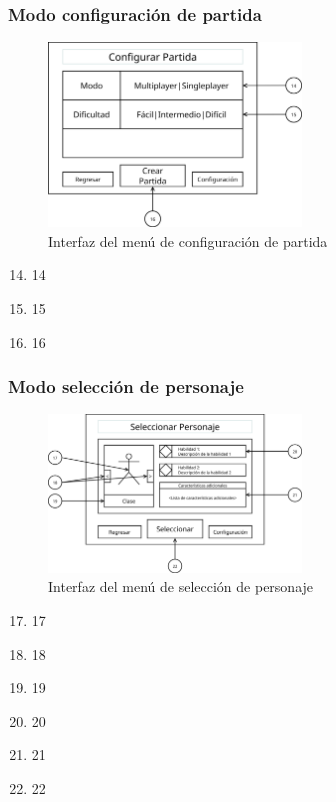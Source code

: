 \subsubsection{Modo configuración de partida}
\begin{figure}[H]
    \centering
    \includegraphics[width=0.6\textwidth]{5-Cuerpo/Chapter5/I4.png} %
    \caption{Interfaz del menú de configuración de partida}
    \label{fig:Interface_Configuracion_Partida}
\end{figure}
\begin{enumerate}\setcounter{enumi}{13}
    \item 14
    \item 15
    \item 16
\end{enumerate}

\subsubsection{Modo selección de personaje}
\begin{figure}[H]
    \centering
    \includegraphics[width=0.6\textwidth]{5-Cuerpo/Chapter5/I5.png} %
    \caption{Interfaz del menú de selección de personaje}
    \label{fig:Interface_Seleccion_Personaje}
\end{figure}
\begin{enumerate}\setcounter{enumi}{16}
    \item 17
    \item 18
    \item 19
    \item 20
    \item 21
    \item 22
\end{enumerate}

